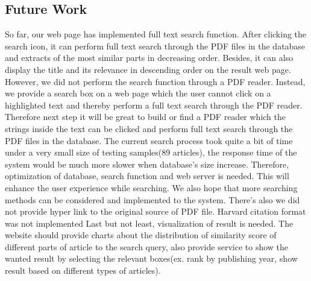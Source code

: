 
\subsection{Future Work}
So far, our web page has  implemented full text search function. After clicking the search icon, it can perform full text search through the PDF files in the database and extracts of the most similar parts in decreasing order. Besides, it can also display the title and its relevance in descending order  on the result web page.
However, we did not perform the search function through a PDF reader. Instead, we provide a search box on a web page which the user cannot click on a highlighted text and thereby perform a full text search through the PDF reader. Therefore next step it will be great to build or find a PDF reader which the strings inside the text can be clicked and perform full text search through the PDF files in the database. The current search process took quite a bit of time under a very small size of testing samples(89 articles), the response time of the system would be much more slower when database's size increase. Therefore, optimization of database, search function and web server is needed. This will enhance the user experience while searching. We also hope that more searching methods can be considered and implemented to the system. There's also we did not provide hyper link to the original source of PDF file. Harvard citation format was not implemented
Last but not least, visualization of result is needed. The website should provide charts about the distribution of similarity score of different parts of article to the search query, also provide service to show the wanted result by selecting the relevant boxes(ex. rank by publishing year, show result based on different types of articles).